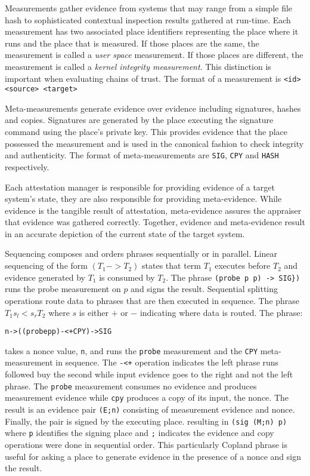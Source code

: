 \documentclass[sigconf,authordraft]{acmart}
\begin{document}
Measurements gather evidence from systems that may range from a simple
file hash to sophisticated contextual inspection results gathered at
run-time.  Each measurement has two associated place identifiers
representing the place where it runs and the place that is measured.
If those places are the same, the measurement is called a \emph{user
  space} measurement.  If those places are different, the measurement
is called a \emph{kernel integrity measurement}.  This distinction is
important when evaluating chains of trust.  The format of a
measurement is \verb+<id> <source> <target>+

Meta-measurements generate evidence over evidence including
signatures, hashes and copies.  Signatures are generated by the place
executing the signature command using the place's private key.  This
provides evidence that the place possessed the measurement and is used
in the canonical fashion to check integrity and authenticity.  The
format of meta-measurements are \verb+SIG+, \verb+CPY+ and \verb+HASH+
respectively.

Each attestation manager is responsible for providing evidence of a
target system's state, they are also responsible for providing
meta-evidence. While evidence is the tangible result of attestation,
meta-evidence assures the appraiser that evidence was gathered
correctly. Together, evidence and meta-evidence result in an accurate
depiction of the current state of the target system.

Sequencing composes and orders phrases sequentially or in parallel.
Linear sequencing of the form $(T_1 \mathtt{->} T_2)$ states that term
$T_1$ executes before $T_2$ and evidence generated by $T_1$ is
consumed by $T_2$.  The phrase \verb+(probe p p) -> SIG})+ runs the
\textsf{probe} measurement on $p$ and signs the result.  Sequential
splitting operations route data to phrases that are then executed in
sequence.  The phrase $T_1 s_l\mathtt{<}s_r T_2$ where $s$ is either
$+$ or $-$ indicating where data is routed.  The phrase:

\begin{alltt}
  n -> ((probe p p) -<+ CPY) -> SIG
\end{alltt}

\noindent takes a nonce value, \verb+n+, and runs the \verb+probe+
measurement and the \verb+CPY+ meta-measurement in sequence.  The
\verb!-<+! operation indicates the left phrase runs followed buy the
second while input evidence goes to the right and not the left phrase.
The \verb+probe+ measurement consumes no evidence and produces
measurement evidence while \verb+cpy+ produces a copy of its input,
the nonce.  The result is an evidence pair \verb+(E;n)+ consisting of
measurement evidence and nonce.  Finally, the pair is signed by the
executing place. resulting in \verb+(sig (M;n) p)+ where \verb+p+
identifies the signing place and \verb+;+ indicates the evidence and
copy operations were done in sequential order.  This particularly
Copland phrase is useful for asking a place to generate evidence in
the presence of a nonce and sign the result.
\end{document}
